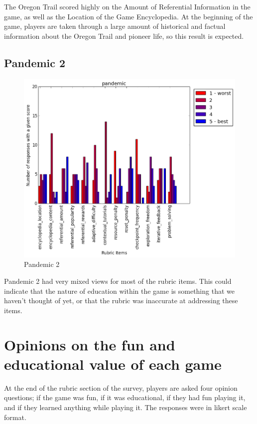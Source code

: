 				The Oregon Trail scored highly on the Amount of Referential Information in the game, as well as the Location of the Game Encyclopedia. At the beginning of the game, players are taken through a large amount of historical and factual information about the Oregon Trail and pioneer life, so this result is expected.

			\subsection{Pandemic 2}

				\begin{figure}[] 
				\centering 
				\includegraphics[width=\textwidth, height=.4\textheight, keepaspectratio=true]{pandemic_scores.png} 
				\caption{Pandemic 2}
				\end{figure}

				Pandemic 2 had very mixed views for most of the rubric items. This could indicate that the nature of education within the game is something that we haven't thought of yet, or that the rubric was inaccurate at addressing these items.

			\clearpage

		\section{Opinions on the fun and educational value of each game}

			At the end of the rubric section of the survey, players are asked four opinion questions; if the game was fun, if it was educational, if they had fun playing it, and if they learned anything while playing it. The responses were in likert scale format.

